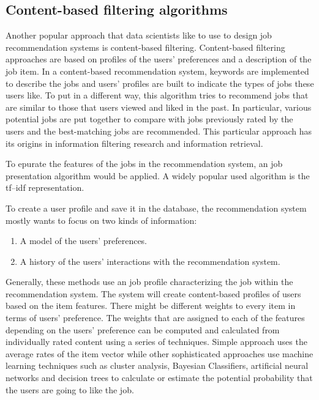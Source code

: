 \documentclass[sigconf]{acmart}
\begin{document}
\subsection{Content-based filtering algorithms}
Another popular approach that data scientists like to use to design job recommendation systems is content-based filtering. Content-based filtering approaches are based on profiles of the users’ preferences and a description of the job item. In a content-based recommendation system, keywords are implemented to describe the jobs and users' profiles are built to indicate the types of jobs these users like. To put in a different way, this algorithm tries to recommend jobs that are similar to those that users viewed and liked in the past. In particular, various potential jobs are put together to compare with jobs previously rated by the users and the best-matching jobs are recommended. This particular approach has its origins in information filtering research and information retrieval.

\par To epurate the features of the jobs in the recommendation system, an job presentation algorithm would be applied. A widely popular used algorithm is the tf–idf representation.

\par To create a user profile and save it in the database, the recommendation system mostly wants to focus on two kinds of information:
\begin{enumerate}
  \item A model of the users' preferences.
  \item A history of the users' interactions with the recommendation system.
\end{enumerate}

\par Generally, these methods use an job profile characterizing the job within the recommendation system. The system will create content-based profiles of users based on the item features. There might be different weights to every item in terms of users' preference. The weights that are assigned to each of the features depending on the users' preference can be computed and calculated from individually rated content using a series of techniques. Simple approach uses the average rates of the item vector while other sophisticated approaches use machine learning techniques such as cluster analysis, Bayesian Classifiers, artificial neural networks and decision trees to calculate or estimate the potential probability that the users are going to like the job.
\end{document}
